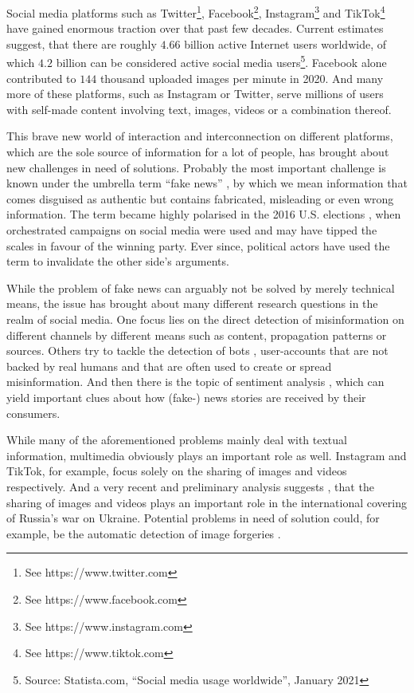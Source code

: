Social media platforms such as Twitter\footnote{See https://www.twitter.com}, Facebook\footnote{See https://www.facebook.com}, Instagram\footnote{See https://www.instagram.com} and TikTok\footnote{See https://www.tiktok.com} have gained enormous traction over that past few decades. Current estimates suggest, that there are roughly $4.66$ billion active Internet users worldwide, of which $4.2$ billion can be considered active social media users\footnote{Source: Statista.com, ``Social media usage worldwide'', January 2021}. Facebook alone contributed to $144$ thousand uploaded images per minute in 2020. And many more of these  platforms, such as Instagram or Twitter, serve millions of users with self-made content involving text, images, videos or a combination thereof.

This brave new world of interaction and interconnection on different platforms, which are the sole source of information for a lot of people, has brought about new challenges in need of solutions. Probably the most important challenge is known under the umbrella term ``fake news'' \cite{Lazer:2018Science}, by which we mean information that comes disguised as authentic but contains fabricated, misleading or even wrong information. The term became highly polarised in the 2016 U.S. elections \cite{Quandt:2019Fake}, when orchestrated campaigns on social media were used and may have tipped the scales in favour of the winning party. Ever since, political actors have used the term to invalidate the other side's arguments.

While the problem of fake news can arguably not be solved by merely technical means, the issue has brought about many different research questions in the realm of social media. One focus lies on the direct detection of misinformation on different channels \cite{Zhou:2020Survey} by different means such as content, propagation patterns or sources. Others try to tackle the detection of bots \cite{Cresci:2020Decade}, user-accounts that are not backed by real humans and that are often used to create or spread misinformation. And then there is the topic of sentiment analysis \cite{Yue:2019Survey}, which can yield important clues about how (fake-) news stories are received by their consumers.

While many of the aforementioned problems mainly deal with textual information, multimedia obviously plays an important role as well. Instagram and TikTok, for example, focus solely on the sharing of images and videos respectively. And a very recent and preliminary analysis suggests \cite{Ciuriak:2022Role}, that the sharing of images and videos plays an important role in the international covering of Russia's war on Ukraine. Potential problems in need of solution could, for example, be the automatic detection of image forgeries \cite{Farid:2009Image}.

